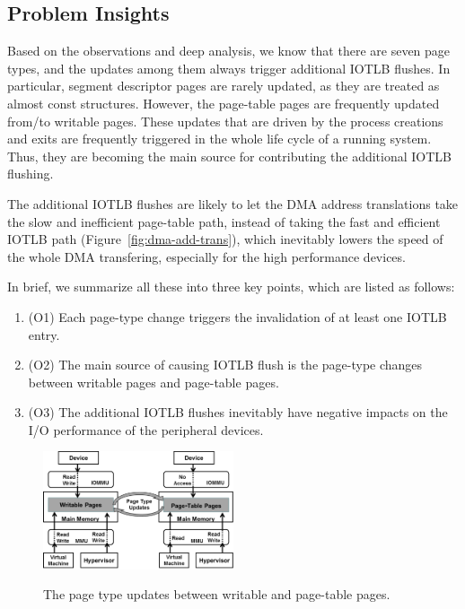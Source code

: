 \subsection{Problem Insights} \label{sec:insight}
Based on the observations and deep analysis, we know that there are seven page types, and the updates among them always trigger additional IOTLB flushes.
In particular, segment descriptor pages are rarely updated, as they are treated as almost const structures.
However, the page-table pages are frequently updated from/to writable pages.
These updates that are driven by the process creations and exits are frequently triggered in the whole life cycle of a running system.
Thus, they are becoming the main source for contributing the additional IOTLB flushing.

The additional IOTLB flushes are likely to let the DMA address
translations take the slow and inefficient page-table path,
instead of taking the fast and efficient IOTLB path (Figure~\ref{fig:dma-add-trans}), which inevitably lowers the
speed of the whole DMA transfering, especially for the high performance devices.


In brief, we summarize all these into three key points, which are listed as follows:
\begin{enumerate}
\item (O1) Each page-type change triggers the invalidation of at least one IOTLB entry.
\item (O2) The main source of causing IOTLB flush is the page-type changes between writable pages and page-table pages.
\item (O3) The additional IOTLB flushes inevitably have negative impacts on the I/O performance of the peripheral devices.
\end{enumerate}

\begin{figure}[ht]
\centering
\includegraphics[width=0.5\textwidth]{image/background/wr2pt.png} \\
\caption{The page type updates between writable and page-table pages.}
\label{fig:wr2pt}
\end{figure}

